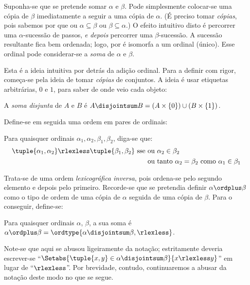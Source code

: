 \documentclass[../../../include/open-logic-section]{subfiles}
\begin{document}

Suponha-se que se pretende somar $\alpha$ e $\beta$. Pode simplesmente colocar-se uma
{cópia} de $\beta$ imediatamente a seguir a uma cópia de $\alpha$. (É preciso tomar
\emph{cópias}, pois sabemos por
 que ou $\alpha
\subseteq \beta$ ou $\beta \subseteq \alpha$.) O efeito intuitivo disto
é percorrer uma $\alpha$-sucessão de passos, \emph{e depois}
percorrer uma $\beta$-sucessão. A sucessão resultante fica
bem ordenada; logo, por
 é isomorfa
a um ordinal (único). Esse ordinal pode considerar-se a \emph{soma}
de $\alpha$ e $\beta$.

Esta é a ideia intuitiva por detrás da adição ordinal. Para a definir
com rigor, começa-se pela ideia de tomar \emph{cópias} de conjuntos.
A ideia é usar etiquetas arbitrárias, $0$ e $1$, para saber de onde
veio cada objeto:

\begin{defn}
A \emph{soma disjunta} de $A$ e $B$ é $A \disjointsum B = (A\times
\{0\}) \cup (B \times \{1\})$.
\end{defn}

Define-se em seguida uma ordem em pares de ordinais:

\begin{defn}
Para quaisquer ordinais $\alpha_1, \alpha_2, \beta_1, \beta_2$, diga-se que:
\begin{align*}
	\tuple{\alpha_1, \alpha_2} \rlexless \tuple{\beta_1, \beta_2}\text{ sse }&
	\text{ou $\alpha_2 \in \beta_2$}\\
	& \text{ou tanto $\alpha_2 = \beta_2$ como $\alpha_1 \in \beta_1$}
\end{align*}
\end{defn}

Trata-se de uma ordem \emph{lexicográfica inversa}, pois ordena-se pelo
segundo elemento e depois pelo primeiro. Recorde-se que se pretendia
definir $\alpha \ordplus \beta$ como o tipo de ordem de uma cópia de $\alpha$
seguida de uma cópia de $\beta$. Para o conseguir, define-se:

\begin{defn}
Para quaisquer ordinais $\alpha$, $\beta$, a sua soma é $\alpha \ordplus
\beta = \ordtype{\alpha \disjointsum \beta, \rlexless}$.
\end{defn}
\noindent
Note-se que aqui se abusou ligeiramente da notação; estritamente deveria escrever-se ``$\Setabs{\tuple{x,y}\in \alpha\disjointsum\beta}{x \rlexless y}$'' em lugar de ``$\rlexless$''. Por brevidade, contudo, continuaremos a abusar da notação deste modo no que se segue.
\end{document}
